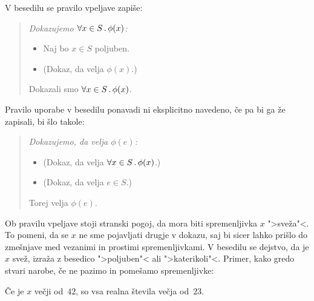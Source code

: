 V besedilu se pravilo vpeljave zapiše:
%
\begin{quote}
  \it
  Dokazujemo $\forall x \in S \,.\, \phi(x)$:
  \begin{itemize}
  \item[] Naj bo $x \in S$ poljuben.
  \item[] (Dokaz, da velja $\phi(x)$.)
  \end{itemize}
  Dokazali smo $\forall x \in S \,.\, \phi(x)$.
\end{quote}
%
Pravilo uporabe v besedilu ponavadi ni eksplicitno navedeno, če pa bi
ga že zapisali, bi šlo takole:
%
\begin{quote}
  \it
  Dokazujemo, da velja $\phi(e)$:
  \begin{itemize}
  \item[] (Dokaz, da velja $\forall x \in S \,.\, \phi(x)$.)
  \item[] (Dokaz, da velja $e \in S$.)
  \end{itemize}
  Torej velja $\phi(e)$.
\end{quote}

Ob pravilu vpeljave stoji stranski pogoj, da mora biti spremenljivka
$x$ ">sveža"<. To pomeni, da se $x$ ne sme pojavljati drugje v dokazu,
saj bi sicer lahko prišlo do zmešnjave med vezanimi in prostimi
spremenljivkami. V besedilu se dejstvo, da je $x$ svež, izraža z
besedico ">poljuben"< ali ">katerikoli"<. Primer, kako gredo stvari
narobe, če ne pazimo in pomešamo spremenljivke:

\begin{izrek}
  Če je $x$ večji od~$42$, so vsa realna števila večja od~$23$.
\end{izrek}

